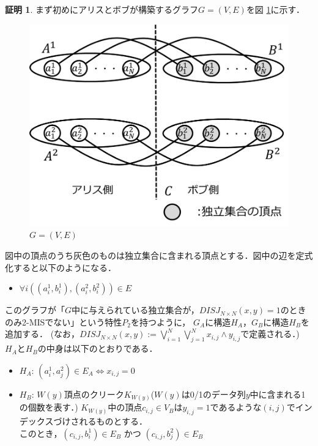 \documentclass[12pt]{thesis}
\theoremstyle{definition}
\newtheorem*{prf*}{証明}
\begin{document}
\begin{prf*}
まず初めにアリスとボブが構築するグラフ$G = (V, E)$を図 \ref{2_G}に示す． 

\begin{figure}[ht]
\begin{center}
\includegraphics[width=120mm]{2_G.png}
\end{center}
\caption{$G = (V, E)$}
\label{2_G}
\end{figure}

図中の頂点のうち灰色のものは独立集合に含まれる頂点とする．図中の辺を定式化すると以下のようになる．
\begin{itemize}
\item $\forall i((a_{i}^{1}, b_{i}^{1}), (a_{i}^{2}, b_{i}^{2})) \in E$
\end{itemize}

このグラフが「$G$中に与えられている独立集合が，$DISJ_{N \times N} (x, y) = 1$のときのみ2-MISでない」という特性$P_{2}$を持つように，
$G_{A}$に構造$H_{A}$，$G_{B}$に構造$H_{B}$を追加する．
(なお，$DISJ_{N \times N} (x, y) :=\bigvee_{i = 1}^{N} \bigvee_{j = 1}^{N} x_{i, j} \land y_{i, j}$で定義される．)
$H_{A}$と$H_{B}$の中身は以下のとおりである．

\newpage
\begin{itemize}
\item $H_{A}$: $(a_{i}^{1}, a_{j}^{2}) \in E_{A} \Leftrightarrow x_{i, j} = 0$
\item $H_{B}$: $W(y)$頂点のクリーク$K_{W(y)}$($W(y)$は0/1のデータ列$y$中に含まれる1の個数を表す．)
$K_{W(y)}$中の頂点$c_{i, j} \in V_{B}$は$y_{i, j} = 1$であるような$(i, j)$でインデックスづけされるものとする． \\
このとき，$(c_{i, j}, b_{i}^{1}) \in E_{B}$ かつ $(c_{i, j}, b_{j}^{2}) \in E_{B}$
\end{itemize}


\end{prf*}
\end{document}
